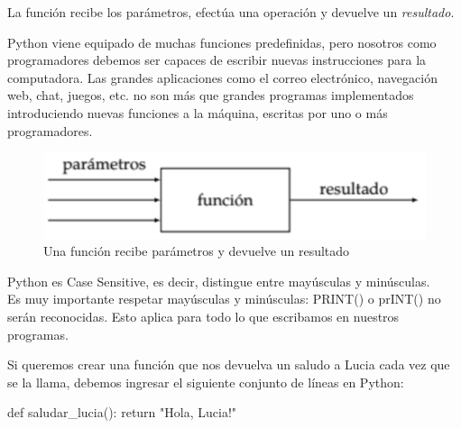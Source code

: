 \documentclass[
  letterpaper,
  DIV=11,
  numbers=noendperiod]{scrreprt}
\newenvironment{Shaded}{\begin{snugshade}}{\end{snugshade}}
\newcommand{\ControlFlowTok}[1]{\textcolor[rgb]{0.00,0.23,0.31}{#1}}
\newcommand{\KeywordTok}[1]{\textcolor[rgb]{0.00,0.23,0.31}{#1}}
\newcommand{\NormalTok}[1]{\textcolor[rgb]{0.00,0.23,0.31}{#1}}
\newcommand{\StringTok}[1]{\textcolor[rgb]{0.13,0.47,0.30}{#1}}
\begin{document}
La función recibe los parámetros, efectúa una operación y devuelve un
\emph{resultado}.

Python viene equipado de muchas funciones predefinidas, pero nosotros
como programadores debemos ser capaces de escribir nuevas instrucciones
para la computadora. Las grandes aplicaciones como el correo
electrónico, navegación web, chat, juegos, etc. no son más que grandes
programas implementados introduciendo nuevas funciones a la máquina,
escritas por uno o más programadores.

\begin{figure}

{\centering \includegraphics{./imgs/unidad_2/funcion.png}

}

\caption{Una función recibe parámetros y devuelve un resultado}

\end{figure}

\begin{tcolorbox}[enhanced jigsaw, colframe=quarto-callout-note-color-frame, opacityback=0, opacitybacktitle=0.6, bottomrule=.15mm, toprule=.15mm, coltitle=black, breakable, colback=white, leftrule=.75mm, titlerule=0mm, bottomtitle=1mm, toptitle=1mm, rightrule=.15mm, title=\textcolor{quarto-callout-note-color}{\faInfo}\hspace{0.5em}{Python es Case Sensitive}, arc=.35mm, left=2mm, colbacktitle=quarto-callout-note-color!10!white]

Python es Case Sensitive, es decir, distingue entre mayúsculas y
minúsculas.\\
Es muy importante respetar mayúsculas y minúsculas: PRINT() o prINT() no
serán reconocidas. Esto aplica para todo lo que escribamos en nuestros
programas.

\end{tcolorbox}

Si queremos crear una función que nos devuelva un saludo a Lucia cada
vez que se la llama, debemos ingresar el siguiente conjunto de líneas en
Python:

\begin{Shaded}
\begin{Highlighting}[]
\KeywordTok{def}\NormalTok{ saludar\_lucia():}
  \ControlFlowTok{return} \StringTok{"Hola, Lucia!"}
\end{Highlighting}
\end{Shaded}
\end{document}
